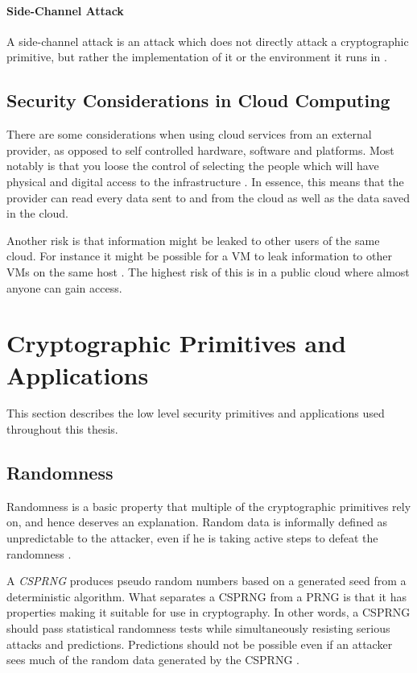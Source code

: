 \documentclass[pdftex,english,10pt,b5paper,twoside]{book}
\begin{document}
\paragraph{Side-Channel Attack} A side-channel attack is an attack which does
not directly attack a cryptographic primitive, but rather the implementation of
it or the environment it runs in \cite{schneier}.

\subsection{Security Considerations in Cloud Computing}

There are some considerations when using cloud services from an external
provider, as opposed to self controlled hardware, software and platforms. Most
notably is that you loose the control of selecting the people which will have
physical and digital access to the infrastructure \cite{cloud_getoff}. In
essence, this means that the provider can read every data sent to and from the
cloud as well as the data saved in the cloud.

Another risk is that information might be leaked to other users of the same
cloud. For instance it might be possible for a \ac{VM} to leak information
to other \acp{VM} on the same host \cite{cloud_getoff}. The highest risk of
this is in a public cloud where almost anyone can gain access.


\section{Cryptographic Primitives and Applications}

This section describes the low level security primitives and applications used
throughout this thesis.

\subsection{Randomness}

Randomness is a basic property that multiple of the cryptographic
primitives rely on, and hence deserves an explanation. Random data is
informally defined as unpredictable to the attacker, even if he is taking
active steps to defeat the randomness \cite[p. 137]{schneier}.

A \emph{\ac{CSPRNG}} produces pseudo random numbers based on a generated seed
from a deterministic algorithm. What separates a \ac{CSPRNG} from a PRNG is
that it has properties making it suitable for use in cryptography. In other
words, a \ac{CSPRNG} should pass statistical randomness tests while
simultaneously resisting serious attacks and predictions. Predictions should
not be possible even if an attacker sees much of the random data generated by
the \ac{CSPRNG} \cite[p. 140]{schneier}.
\end{document}
